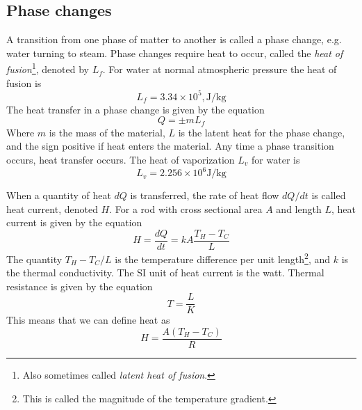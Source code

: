 \documentclass[nobib,notoc]{tufte-handout}
\begin{document}
\subsection{Phase changes}
A transition from one phase of matter to another is called a phase change, e.g. water turning to steam. Phase changes require heat to occur, called the \emph{heat of fusion}\footnote{Also sometimes called \emph{latent heat of fusion}.}, denoted by \(L_f\). For water at normal atmospheric pressure the heat of fusion is
\begin{equation*}
	L_f=3.34\times 10^5 ,\text{J/kg}
\end{equation*}
The heat transfer in a phase change is given by the equation
\begin{equation*}
	Q=\pm mL_f
\end{equation*}
Where \(m\) is the mass of the material, \(L\) is the latent heat for the phase change, and the sign positive if heat enters the material. Any time a phase transition occurs, heat transfer occurs.
\medbreak
\noindent The heat of vaporization \(L_v\) for water is
\begin{equation*}
	L_v=2.256\times 10^6 \text{J/kg}
\end{equation*}
\begin{defi}
	When a quantity of heat \(dQ\) is transferred, the rate of heat flow \(dQ/dt\) is called heat current, denoted \(H\). For a rod with cross sectional area \(A\) and length \(L\), heat current is given by the equation
	\begin{equation*}
		H=\frac{dQ}{dt}=kA\frac{T_H-T_C}{L}
	\end{equation*}
	The quantity \(T_H-T_C/L\) is the temperature difference per unit length\footnote{This is called the magnitude of the temperature gradient.}, and \(k\) is the thermal conductivity. The SI unit of heat current is the watt.
\medbreak
\noindent Thermal resistance is given by the equation
	\begin{equation*}
		T=\frac{L}{K}
	\end{equation*}
This means that we can define heat as
	\begin{equation*}
		H=\frac{A(T_H-T_C)}{R}
	\end{equation*}
\end{defi}
\end{document}
